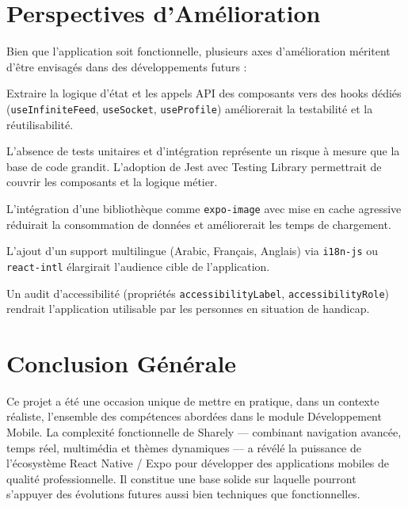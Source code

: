 \section*{Perspectives d'Amélioration}

Bien que l'application soit fonctionnelle, plusieurs axes d'amélioration méritent d'être envisagés dans des développements futurs :

\begin{description}[leftmargin=1.8em]
    \item[\textbf{Hooks personnalisés.}] Extraire la logique d'état et les appels API des composants vers des hooks dédiés (\texttt{useInfiniteFeed}, \texttt{useSocket}, \texttt{useProfile}) améliorerait la testabilité et la réutilisabilité.

    \item[\textbf{Tests automatisés.}] L'absence de tests unitaires et d'intégration représente un risque à mesure que la base de code grandit. L'adoption de Jest avec Testing Library permettrait de couvrir les composants et la logique métier.

    \item[\textbf{Optimisation des images.}] L'intégration d'une bibliothèque comme \texttt{expo-image} avec mise en cache agressive réduirait la consommation de données et améliorerait les temps de chargement.

    \item[\textbf{Internationalisation.}] L'ajout d'un support multilingue (Arabic, Français, Anglais) via \texttt{i18n-js} ou \texttt{react-intl} élargirait l'audience cible de l'application.

    \item[\textbf{Accessibilité.}] Un audit d'accessibilité (propriétés \texttt{accessibilityLabel}, \texttt{accessibilityRole}) rendrait l'application utilisable par les personnes en situation de handicap.
\end{description}

\section*{Conclusion Générale}

Ce projet a été une occasion unique de mettre en pratique, dans un contexte réaliste, l'ensemble des compétences abordées dans le module Développement Mobile. La complexité fonctionnelle de Sharely --- combinant navigation avancée, temps réel, multimédia et thèmes dynamiques --- a révélé la puissance de l'écosystème React Native / Expo pour développer des applications mobiles de qualité professionnelle. Il constitue une base solide sur laquelle pourront s'appuyer des évolutions futures aussi bien techniques que fonctionnelles.
